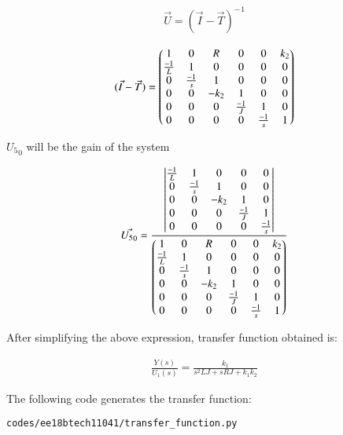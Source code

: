 \begin{enumerate}[label=\thesection.\arabic*.,ref=\thesection.\theenumi]
\begin{align}
    \Vec{U} = {(\Vec{I}-\Vec{T})^-}^1
    \label{eq:ee18btech11041_10}
\end{align}

\begin{align}
    (\Vec{I}-\Vec{T}) = \begin{pmatrix}1 & 0 & R & 0 & 0 & k_2\\
    \frac{-1}{L} & 1 & 0 & 0 & 0 & 0\\
    0 & \frac{-1}{s} & 1 & 0 & 0 & 0\\
    0 & 0 & -k_2 & 1 & 0 & 0\\
    0 & 0 & 0 & \frac{-1}{J} & 1 & 0\\
    0 & 0 & 0 & 0& \frac{-1}{s} & 1 \end{pmatrix}
    \label{eq:ee18btech11041_10}
\end{align}

${U_5}_0$ will be the gain of the system

\begin{align}
    \Vec{{U_5}_0} = \frac{\begin{vmatrix}\frac{-1}{L} & 1 & 0 & 0 & 0 \\
    0 & \frac{-1}{s} & 1 & 0 & 0 \\
    0 & 0 & -k_2 & 1 & 0 \\
    0 & 0 & 0 & \frac{-1}{J} & 1 \\
    0 & 0 & 0 & 0& \frac{-1}{s} \end{vmatrix}}{ \begin{pmatrix}1 & 0 & R & 0 & 0 & k_2\\
    \frac{-1}{L} & 1 & 0 & 0 & 0 & 0\\
    0 & \frac{-1}{s} & 1 & 0 & 0 & 0\\
    0 & 0 & -k_2 & 1 & 0 & 0\\
    0 & 0 & 0 & \frac{-1}{J} & 1 & 0\\
    0 & 0 & 0 & 0& \frac{-1}{s} & 1 \end{pmatrix}}
    \label{eq:ee18btech11041_11}
\end{align}

After simplifying the above expression, transfer function obtained is:

\begin{align}
    \frac{Y(s)}{U_1(s)}=\frac{k_1}{s^2LJ+sRJ+k_1k_2}
    \label{eq:ee18btech11041_12}
\end{align}

The following code generates the transfer function:
\begin{lstlisting}
codes/ee18btech11041/transfer_function.py
\end{lstlisting}



\end{enumerate}